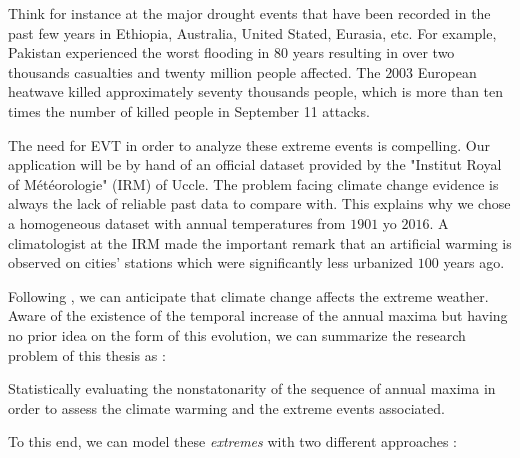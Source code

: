 \documentclass[11pt,a4paper,openany, twosided]{book}
\begin{document}
Think for instance at the major drought events that have been recorded in the past few years in Ethiopia, Australia, United Stated, Eurasia, etc. For example, Pakistan experienced the worst flooding in $80$ years resulting in over two thousands casualties and twenty million people affected. The $2003$ European heatwave killed approximately seventy thousands people, which is more than ten times the number of killed people in September 11 attacks. 


The need for EVT in order to analyze these extreme events is compelling.
Our application will be by hand of an official dataset provided by the "Institut Royal of Météorologie" (IRM) of Uccle. 
The problem facing climate change evidence is always the lack of reliable past data to compare with. This explains why we chose a homogeneous dataset with annual temperatures from $1901$ yo $2016$. A climatologist at the IRM made the important remark that an artificial warming is observed on cities' stations which were significantly less urbanized $100$ years ago. 


Following \citet{kharin_changes_2007}, we can anticipate that climate change affects the extreme weather. Aware of the existence of the temporal increase of the annual maxima but having no prior idea on the form of this evolution, we can summarize the research problem of this thesis as : 
\vspace{0.1cm}
\begin{tcolorbox}%
	Statistically evaluating the nonstatonarity of the sequence of annual maxima in order to assess the climate warming and the extreme events associated. 
\end{tcolorbox}
To this end, we can model these \emph{extremes} with two different approaches : 
\end{document}
